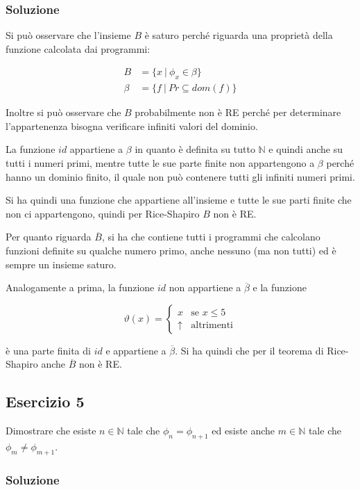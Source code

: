 \subsubsection{Soluzione}

Si può osservare che l'insieme $B$ è saturo perché riguarda una proprietà della funzione calcolata dai programmi:

\begin{align*}
	B &= \{ x \: | \: \phi_x \in \beta \} \\
	\beta &= \{f \: | \: Pr \subseteq dom(f)\}
\end{align*}

Inoltre si può osservare che $B$ probabilmente non è RE perché per determinare l'appartenenza bisogna verificare infiniti valori del dominio.

La funzione $id$ appartiene a $\beta$ in quanto è definita su tutto $\mathbb{N}$ e quindi anche su tutti i numeri primi, mentre tutte le sue parte finite non appartengono a $\beta$ perché hanno un dominio finito, il quale non può contenere tutti gli infiniti numeri primi.

Si ha quindi una funzione che appartiene all'insieme e tutte le sue parti finite che non ci appartengono, quindi per Rice-Shapiro $B$ non è RE.

Per quanto riguarda $\overline{B}$, si ha che contiene tutti i programmi che calcolano funzioni definite su qualche numero primo, anche nessuno (ma non tutti) ed è sempre un insieme saturo.

Analogamente a prima, la funzione $id$ non appartiene a $\overline{\beta}$ e la funzione 

$$
\vartheta(x) = \begin{cases}
x &\text{se } x \leq 5 \\
\uparrow &\text{altrimenti}
\end{cases}
$$

è una parte finita di $id$ e appartiene a $\overline{\beta}$. Si ha quindi che per il teorema di Rice-Shapiro anche $\overline{B}$ non è RE.

\subsection{Esercizio 5}

Dimostrare che esiste $n \in \mathbb{N} $ tale che $\phi_n = \phi_{n+1}$ ed esiste anche $m \in \mathbb{N}$ tale che $\phi_m \neq \phi_{m+1}$.

\subsubsection{Soluzione}

